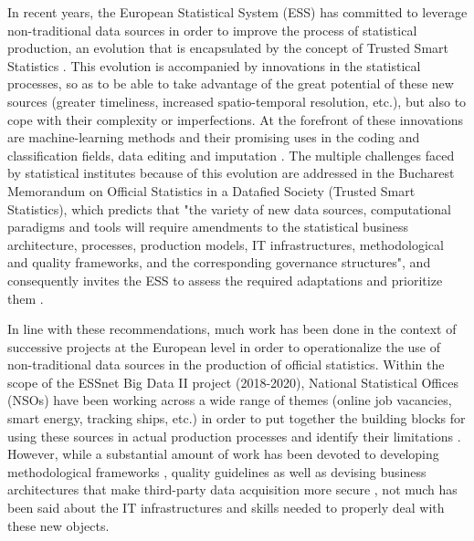 In recent years, the European Statistical System (ESS) has committed to leverage non-traditional data sources in order to improve the process of statistical production, an evolution that is encapsulated by the concept of Trusted Smart Statistics \cite{ricciato2019trusted}. This evolution is accompanied by innovations in the statistical processes, so as to be able to take advantage of the great potential of these new sources (greater timeliness, increased spatio-temporal resolution, etc.), but also to cope with their complexity or imperfections. At the forefront of these innovations are machine-learning methods and their promising uses in the coding and classification fields, data editing and imputation \cite{gjaltema2022high}. The multiple challenges faced by statistical institutes because of this evolution are addressed in the Bucharest Memorandum on Official Statistics in a Datafied Society (Trusted Smart Statistics), which predicts that "the variety of new data sources, computational paradigms and tools will require amendments to the statistical business architecture, processes, production models, IT infrastructures, methodological and quality frameworks, and the corresponding governance structures", and consequently invites the ESS to assess the required adaptations and prioritize them \cite{bucharest2018}.

In line with these recommendations, much work has been done in the context of successive projects at the European level in order to operationalize the use of non-traditional data sources in the production of official statistics. Within the scope of the ESSnet Big Data II project (2018-2020), National Statistical Offices (NSOs) have been working across a wide range of themes (online job vacancies, smart energy, tracking ships, etc.) in order to put together the building blocks for using these sources in actual production processes and identify their limitations \cite{essnetbigdata2}. However, while a substantial amount of work has been devoted to developing methodological frameworks \cite{descy2019towards, salgado2020mobile}, quality guidelines \cite{kowarik2022quality} as well as devising business architectures that make third-party data acquisition more secure \cite{ricciato2018processing}, not much has been said about the IT infrastructures and skills needed to properly deal with these new objects.


